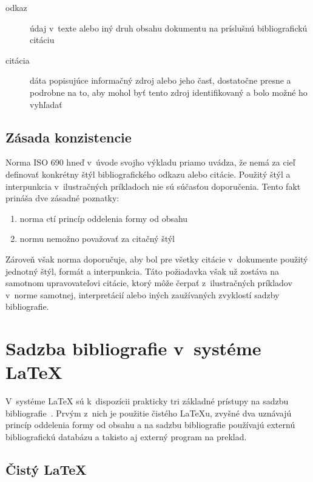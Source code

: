 \documentclass{csbulletin}
\begin{document}
\begin{refsection}
\begin{description}
\item[odkaz] údaj v~texte alebo iný druh obsahu dokumentu na príslušnú bibliografickú citáciu
\item[citácia] dáta popisujúce informačný zdroj alebo jeho časť, dostatočne presne a podrobne na to, aby mohol byť tento zdroj identifikovaný a bolo možné ho vyhľadať
\end{description}

\subsection{Zásada konzistencie}

Norma ISO 690 hneď v~úvode svojho výkladu priamo uvádza, že nemá za cieľ definovať konkrétny štýl bibliografického odkazu alebo citácie. Použitý štýl a interpunkcia v~ilustračných príkladoch nie sú súčasťou doporučenia. Tento fakt prináša dve zásadné poznatky:

\begin{enumerate}
\item norma ctí princíp oddelenia formy od obsahu
\item normu nemožno považovať za citačný štýl~\cite{Hala2013}
\end{enumerate}

\noindent Zároveň však norma doporučuje, aby bol pre všetky citácie v~dokumente použitý jednotný štýl, formát a interpunkcia. Táto požiadavka však už zostáva na samotnom upravovateľovi citácie, ktorý môže čerpať z~ilustračných príkladov v~norme samotnej, interpretácií alebo iných zaužívaných zvyklostí sadzby bibliografie.


\section{Sadzba bibliografie v~systéme \LaTeX{}}\label{ch:latex:bibliography}

V~systéme \LaTeX{} sú k~dispozícii prakticky tri základné prístupy na sadzbu bibliografie~\cite{talbot2013}. Prvým z~nich je použitie čistého \LaTeX u, zvyšné dva uznávajú princíp oddelenia formy od obsahu a na sadzbu bibliografie používajú externú bibliografickú databázu a takisto aj externý program na preklad.

\subsection{Čistý \LaTeX}\label{bib:pure:latex}


\end{refsection}
\end{document}
